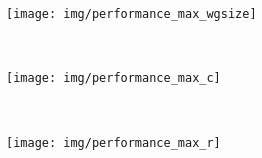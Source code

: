 \begin{subfigure}[h]{\textwidth}
  \centering
  \texttt{[image: img/performance\_max\_wgsize]}
  \vspace{-1.5em} %
  \caption{}
  \label{fig:performance-max-wgsize}
\end{subfigure}
\\
\begin{subfigure}[h]{.48\textwidth}
  \centering
  \texttt{[image: img/performance\_max\_c]}
  \vspace{-1.5em} %
  \caption{}
  \label{fig:performance-wg-c}
\end{subfigure}
~%
\begin{subfigure}[h]{.48\textwidth}
  \centering
  \texttt{[image: img/performance\_max\_r]}
  \vspace{-1.5em} %
  \caption{}
  \label{fig:performance-wg-r}
\end{subfigure}
